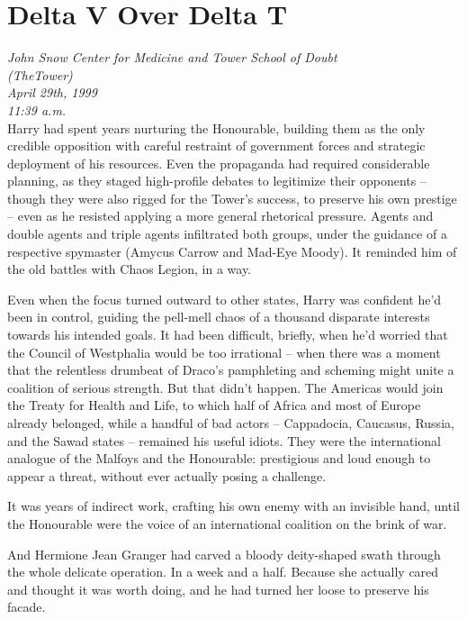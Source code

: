 \hypertarget{delta-v-over-delta-t}{%
\chapter{Delta V Over Delta T}\label{delta-v-over-delta-t}}

\emph{John Snow Center for Medicine and Tower School of Doubt\\
(TheTower)}\\
\emph{April 29th, 1999}\\
\emph{11:39 a.m.}\\

Harry had spent years nurturing the Honourable, building them as the
only credible opposition with careful restraint of government forces and
strategic deployment of his resources. Even the propaganda had required
considerable planning, as they staged high-profile debates to legitimize
their opponents -- though they were also rigged for the Tower's success,
to preserve his own prestige -- even as he resisted applying a more
general rhetorical pressure. Agents and double agents and triple agents
infiltrated both groups, under the guidance of a respective spymaster
(Amycus Carrow and Mad-Eye Moody). It reminded him of the old battles
with Chaos Legion, in a way.

Even when the focus turned outward to other states, Harry was confident
he'd been in control, guiding the pell-mell chaos of a thousand
disparate interests towards his intended goals. It had been difficult,
briefly, when he'd worried that the Council of Westphalia would be too
irrational -- when there was a moment that the relentless drumbeat of
Draco's pamphleting and scheming might unite a coalition of serious
strength. But that didn't happen. The Americas would join the Treaty for
Health and Life, to which half of Africa and most of Europe already
belonged, while a handful of bad actors -- Cappadocia, Caucasus, Russia,
and the Sawad states -- remained his useful idiots. They were the
international analogue of the Malfoys and the Honourable: prestigious
and loud enough to appear a threat, without ever actually posing a
challenge.

It was years of indirect work, crafting his own enemy with an invisible
hand, until the Honourable were the voice of an international coalition
on the brink of war.

And Hermione Jean Granger had carved a bloody deity-shaped swath through
the whole delicate operation. In a week and a half. Because she actually
cared and thought it was worth doing, and he had turned her loose to
preserve his facade.

